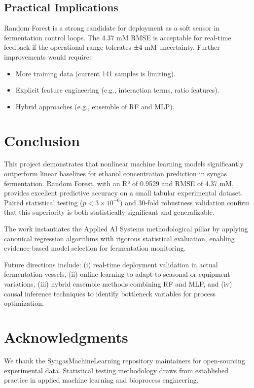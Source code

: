\documentclass[conference]{IEEEtran}
\begin{document}
\subsection{Practical Implications}
Random Forest is a strong candidate for deployment as a soft sensor in fermentation control loops. The 4.37 mM RMSE is acceptable for real-time feedback if the operational range tolerates ±4 mM uncertainty. Further improvements would require:
\begin{itemize}
\item More training data (current 141 samples is limiting).
\item Explicit feature engineering (e.g., interaction terms, ratio features).
\item Hybrid approaches (e.g., ensemble of RF and MLP).
\end{itemize}

\section{Conclusion}

This project demonstrates that nonlinear machine learning models significantly outperform linear baselines for ethanol concentration prediction in syngas fermentation. Random Forest, with an R² of 0.9529 and RMSE of 4.37 mM, provides excellent predictive accuracy on a small tabular experimental dataset. Paired statistical testing ($p < 3 \times 10^{-6}$) and 30-fold robustness validation confirm that this superiority is both statistically significant and generalizable.

The work instantiates the Applied AI Systems methodological pillar by applying canonical regression algorithms with rigorous statistical evaluation, enabling evidence-based model selection for fermentation monitoring.

Future directions include: (i) real-time deployment validation in actual fermentation vessels, (ii) online learning to adapt to seasonal or equipment variations, (iii) hybrid ensemble methods combining RF and MLP, and (iv) causal inference techniques to identify bottleneck variables for process optimization.

\section*{Acknowledgments}
We thank the SyngasMachineLearning repository maintainers for open-sourcing experimental data. Statistical testing methodology draws from established practice in applied machine learning and bioprocess engineering.
\end{document}
